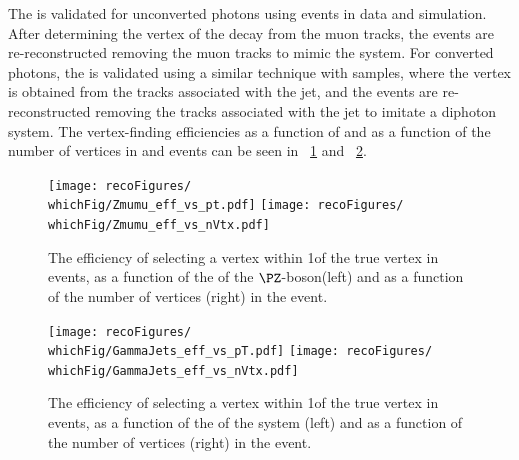 The \VtxIdBdt is validated for unconverted photons using \Zmumu events in data and simulation. After determining the vertex of the decay from the muon tracks, the events are re-reconstructed removing the muon tracks to mimic the \Hgg system. For converted photons, the \VtxIdBdt is validated using a similar technique with \gammaJet samples, where the vertex is obtained from the tracks associated with the jet, and the events are re-reconstructed removing the tracks associated with the jet to imitate a diphoton system. The vertex-finding efficiencies as a function of \pT and as a function of the number of vertices in \Zmumu and \gammaJet events can be seen in \Fig~\ref{fig:reco:vtx_id_eff_zmumu_validation} and \Fig~\ref{fig:reco:vtx_if_eff_gjet_validation}. %
\begin{figure}
\begin{center}
\texttt{[image: recoFigures/\\whichFig/Zmumu\_eff\_vs\_pt.pdf]}
\texttt{[image: recoFigures/\\whichFig/Zmumu\_eff\_vs\_nVtx.pdf]}
\caption{The efficiency of selecting a vertex within 1\cm of the true vertex in \Zmumu events, as a function of the \pT of the $\PZ$-boson(left) and as a function of the number of vertices (right) in the event.}
\label{fig:reco:vtx_id_eff_zmumu_validation}
\end{center}
\end{figure}

\begin{figure}
\begin{center}
\texttt{[image: recoFigures/\\whichFig/GammaJets\_eff\_vs\_pT.pdf]}
\texttt{[image: recoFigures/\\whichFig/GammaJets\_eff\_vs\_nVtx.pdf]}
\caption{The efficiency of selecting a vertex within 1\cm of the true vertex in \gammaJet events, as a function of the \pT of the \gammaJet system (left) and as a function of the number of vertices (right) in the event.}
\label{fig:reco:vtx_if_eff_gjet_validation}
\end{center}
\end{figure}


